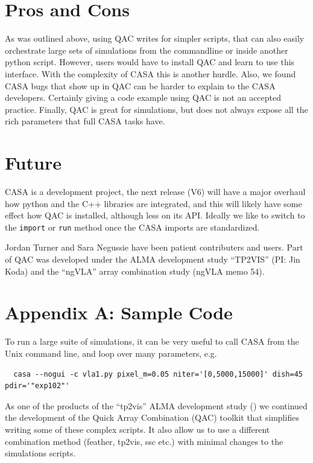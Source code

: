 \documentclass[11pt,twoside]{article}
\begin{document}
\section{Pros and Cons}

As was outlined above, using QAC writes for simpler scripts, that can also easily orchestrate large sets of simulations
from the commandline or inside another python script.
However, users would have to install QAC and learn to use this interface.  With the complexity
of CASA this is another hurdle. Also, we found CASA bugs that show up in QAC can be harder to
explain to the CASA developers. Certainly giving a code example using QAC is not an accepted
practice. Finally, QAC is great for simulations, but does not always expose all the rich parameters
that full CASA tasks have. 

\section{Future}

CASA is a development project, the next release (V6) will have a major overhaul how python and the C++ libraries
are integrated, and this will likely have some effect how QAC is installed, although less on its API. Ideally
we like to switch to the {\tt import} or {\tt run} method once the CASA imports are standardized.

\acknowledgements Jordan Turner and Sara Negussie have been patient contributers and users.
Part of QAC was developed under the ALMA development study ``TP2VIS''  (PI: Jin Koda) and
the ``ngVLA'' array combination study (ngVLA memo 54).



\newpage
\section*{Appendix A: Sample Code}


To run a large suite of simulations, it can be very useful to call CASA from the Unix command line,
and loop over many parameters, e.g.

\footnotesize
\begin{verbatim}
  casa --nogui -c vla1.py pixel_m=0.05 niter='[0,5000,15000]' dish=45 pdir='"exp102"' 
\end{verbatim}
\normalsize

As one of the products of the ``tp2vis'' ALMA development study (\citet{tp2vis})
we continued the development of the
Quick Array Combination (QAC) toolkit that simplifies writing some of these complex scripts. It also allow us
to use a different combination
method (feather, tp2vis, ssc etc.) with minimal changes to the simulations scripts.
\end{document}
